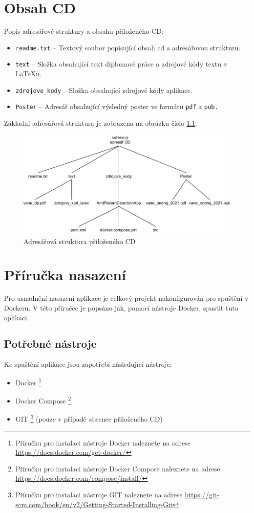 \documentclass[czech,DP]{thesiskiv}
\begin{document}
\chapter{Obsah CD}
Popis adresářové struktury a obsahu přiloženého CD:
\begin{itemize}
    \item \texttt{readme.txt} -- Textový soubor popisující obsah cd a adresářovou strukturu.
    \item\texttt{text} -- Složka obsahující text diplomové práce a zdrojové kódy textu
v \LaTeX u.
    \item \texttt{zdrojove\_kody} -- Složka obsahující zdrojové kódy aplikace.
    \item \texttt{Poster} -- Adresář obsahující výsledný poster ve formátu \texttt{pdf} a \texttt{pub.}
\end{itemize}
Základní adresářová struktura je zobrazena na obrázku číslo \ref{img:cd_content}.
\begin{figure}[!htb]
    \centering
    \includegraphics[width=400pt]{img/cd_content.pdf}
    \caption{Adresářová struktura přiloženého CD}    
    \label{img:cd_content}
\end{figure}
\FloatBarrier
\chapter{Příručka nasazení}
Pro usnadnění nasazení aplikace je celkový projekt nakonfigurován pro spuštění v Dockeru. V této příručce je popsáno jak, pomocí nástroje Docker, spustit tuto aplikaci.
\section{Potřebné nástroje}
Ke spuštění aplikace jsou zapotřebí následující nástroje:
\begin{itemize}
    \item Docker \footnote{Příručku pro instalaci nástroje Docker naleznete na adrese \url{https://docs.docker.com/get-docker/}}
    \item Docker Compose \footnote{Příručku pro instalaci nástroje Docker Compose naleznete na adrese \url{https://docs.docker.com/compose/install/}}
    \item GIT \footnote{Příručku pro instalaci nástroje GIT naleznete na adrese \url{https://git-scm.com/book/en/v2/Getting-Started-Installing-Git}} (pouze v případě absence přiloženého CD)
\end{itemize}
\end{document}
